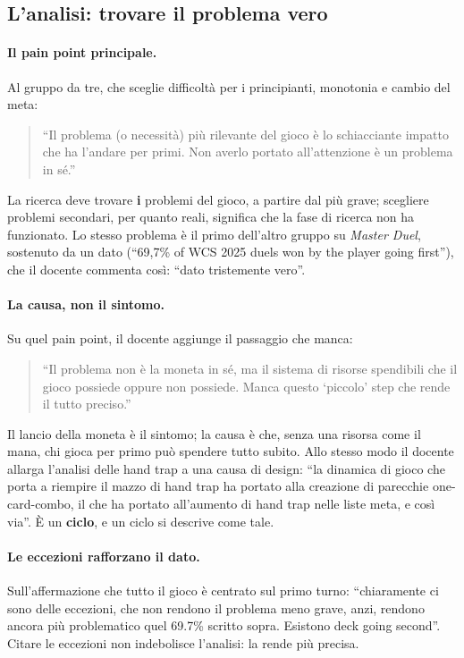 \subsection{L'analisi: trovare il problema vero}
\label{rv:t3:sec:analisi}

\paragraph{Il pain point principale.} Al gruppo da tre, che sceglie
difficoltà per i principianti, monotonia e cambio del meta:
\begin{quote}
  ``Il problema (o necessità) più rilevante del gioco è lo schiacciante
  impatto che ha l'andare per primi. Non averlo portato all'attenzione è un
  problema in sé.''
\end{quote}
La ricerca deve trovare \textbf{i} problemi del gioco, a partire dal più
grave; scegliere problemi secondari, per quanto reali, significa che la fase
di ricerca non ha funzionato. Lo stesso problema è il primo dell'altro gruppo
su \emph{Master Duel}, sostenuto da un dato (``69,7\% of WCS 2025 duels won by
the player going first''), che il docente commenta così: ``dato tristemente
vero''.

\paragraph{La causa, non il sintomo.} Su quel pain point, il docente aggiunge
il passaggio che manca:
\begin{quote}
  ``Il problema non è la moneta in sé, ma il sistema di risorse spendibili
  che il gioco possiede oppure non possiede. Manca questo `piccolo' step che
  rende il tutto preciso.''
\end{quote}
Il lancio della moneta è il sintomo; la causa è che, senza una risorsa come
il mana, chi gioca per primo può spendere tutto subito. Allo stesso modo il
docente allarga l'analisi delle hand trap a una causa di design: ``la
dinamica di gioco che porta a riempire il mazzo di hand trap ha portato alla
creazione di parecchie one-card-combo, il che ha portato all'aumento di hand
trap nelle liste meta, e così via''. È un \textbf{ciclo}, e un ciclo si
descrive come tale.

\paragraph{Le eccezioni rafforzano il dato.} Sull'affermazione che tutto il
gioco è centrato sul primo turno: ``chiaramente ci sono delle eccezioni, che
non rendono il problema meno grave, anzi, rendono ancora più problematico
quel 69.7\% scritto sopra. Esistono deck going second''. Citare le eccezioni
non indebolisce l'analisi: la rende più precisa.

